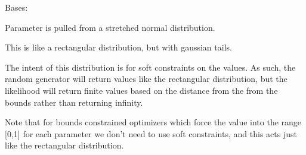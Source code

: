 \documentclass[letterpaper,10pt,english]{sphinxmanual}
\begin{document}
\begin{fulllineitems}
\label{api/mystic.bounds:refl1d.mystic.bounds.SoftBounded}
Bases: 

Parameter is pulled from a stretched normal distribution.

This is like a rectangular distribution, but with gaussian tails.

The intent of this distribution is for soft constraints on the values.
As such, the random generator will return values like the rectangular
distribution, but the likelihood will return finite values based on
the distance from the from the bounds rather than returning infinity.

Note that for bounds constrained optimizers which force the value
into the range {[}0,1{]} for each parameter we don't need to use soft
constraints, and this acts just like the rectangular distribution.

\begin{fulllineitems}
\label{api/mystic.bounds:refl1d.mystic.bounds.SoftBounded.get01}
\end{fulllineitems}


\begin{fulllineitems}
\label{api/mystic.bounds:refl1d.mystic.bounds.SoftBounded.getfull}
\end{fulllineitems}


\begin{fulllineitems}
\label{api/mystic.bounds:refl1d.mystic.bounds.SoftBounded.nllf}
\end{fulllineitems}


\begin{fulllineitems}
\label{api/mystic.bounds:refl1d.mystic.bounds.SoftBounded.put01}
\end{fulllineitems}


\end{fulllineitems}
\end{document}
